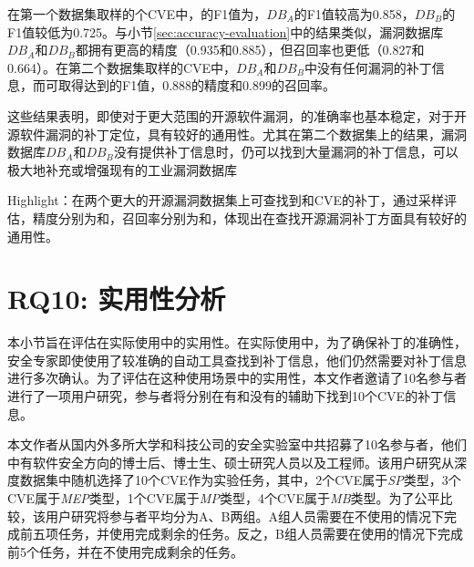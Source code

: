 在第一个数据集取样的个CVE中，\tool 的F1值为，$DB_A$的F1值较高为0.858，$DB_B$的F1值较低为0.725。与小节\ref{sec:accuracy-evaluation}中的结果类似，漏洞数据库$DB_A$和$DB_B$都拥有更高的精度（0.935和0.885），但召回率也更低（0.827和0.664）。在第二个数据集取样的CVE中，$DB_A$和$DB_B$中没有任何漏洞的补丁信息，而\tool 可取得达到的F1值，0.888的精度和0.899的召回率。

这些结果表明，即使对于更大范围的开源软件漏洞，\tool 的准确率也基本稳定，对于开源软件漏洞的补丁定位，\tool 具有较好的通用性。尤其在第二个数据集上的结果，漏洞数据库$DB_A$和$DB_B$没有提供补丁信息时，\tool 仍可以找到大量漏洞的补丁信息，可以极大地补充或增强现有的工业漏洞数据库


\begin{tcolorbox}[size=title,opacityfill=0.15]
Highlight：\tool 在两个更大的开源漏洞数据集上可查找到和CVE的补丁，通过采样评估，精度分别为和，召回率分别为和，体现出\tool 在查找开源漏洞补丁方面具有较好的通用性。
\end{tcolorbox}

\section{RQ10: 实用性分析}\label{sec:usefulness}
本小节旨在评估\tool 在实际使用中的实用性。在实际使用中，为了确保补丁的准确性，安全专家即使使用了较准确的自动工具查找到补丁信息，他们仍然需要对补丁信息进行多次确认。为了评估\tool 在这种使用场景中的实用性，本文作者邀请了10名参与者进行了一项用户研究，参与者将分别在有和没有\tool 的辅助下找到10个CVE的补丁信息。

本文作者从国内外多所大学和科技公司的安全实验室中共招募了10名参与者，他们中有软件安全方向的博士后、博士生、硕士研究人员以及工程师。该用户研究从深度数据集中随机选择了10个CVE作为实验任务，其中，2个CVE属于\textit{SP}类型，3个CVE属于\textit{MEP}类型，1个CVE属于\textit{MP}类型，4个CVE属于\textit{MB}类型。为了公平比较，该用户研究将参与者平均分为A、B两组。A组人员需要在不使用\tool 的情况下完成前五项任务，并使用\tool 完成剩余的任务。反之，B组人员需要在使用\tool 的情况下完成前5个任务，并在不使用\tool 完成剩余的任务。

